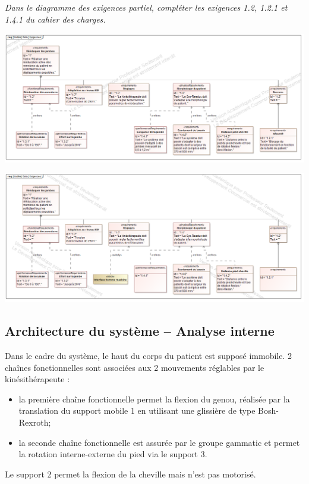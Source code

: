 \documentclass[10pt]{article}
\begin{document}
\subparagraph{}
\textit{Dans le diagramme des exigences partiel, compléter les exigences \textit{1.2}, \textit{1.2.1} et \textit{1.4.1} du cahier des charges.}
\ifprof
\begin{corrige}
\begin{center}
\includegraphics[width=\textwidth]{images/Exigences_Corr}
\end{center}
\end{corrige}
\else
\begin{center}
\includegraphics[width=\textwidth]{images/ExigencesVierges}
\end{center}
\fi

\subsection*{Architecture du système -- Analyse interne}


\ifprof
\else
Dans le cadre du système, le haut du corps du patient est supposé immobile. 2 chaînes fonctionnelles sont associées aux 2 mouvements réglables par le kinésithérapeute :
\begin{itemize}
\item la première chaîne fonctionnelle permet la flexion du genou, réalisée par la translation du support mobile 1 en utilisant une glissière de type Bosh-Rexroth;
\item la seconde chaîne fonctionnelle est assurée par le groupe gammatic et permet la rotation interne-externe du pied via le support 3.
\end{itemize}
Le support 2 permet la flexion de la cheville mais n’est pas motorisé.
\end{document}
